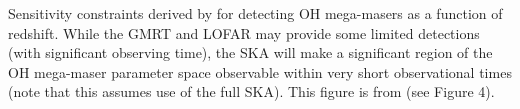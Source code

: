 \label{fig:oh_limits} Sensitivity constraints derived by \citet{darling2002_lumfunc} for detecting OH mega-masers as a function of redshift. While the GMRT and LOFAR may provide some limited detections (with significant observing time), the SKA will make a significant region of the OH mega-maser parameter space observable within very short observational times (note that this assumes use of the full SKA). This figure is from \citet{darling2002_lumfunc} (see Figure 4).